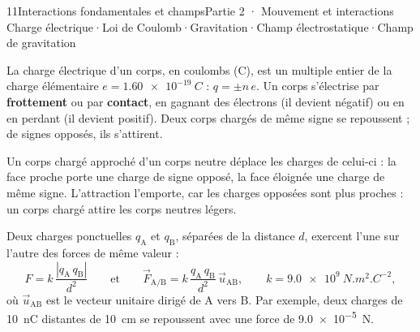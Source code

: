 \begin{ouverture}[gravitation]{11}{Interactions fondamentales et champs}{Partie 2 · Mouvement et interactions}
{Charge électrique\enspace·\enspace Loi de Coulomb\enspace·\enspace Gravitation\enspace·\enspace Champ électrostatique\enspace·\enspace Champ de gravitation}
\end{ouverture}
\essentiel
{}
\begin{definition}
La charge électrique d'un corps, en coulombs (C), est un multiple entier de la charge élémentaire $e=\qty{1,60e-19}{C}$ :
$q=\pm n\,e$. Un corps s'électrise par \textbf{frottement} ou par \textbf{contact}, en gagnant des électrons (il devient négatif) ou en
en perdant (il devient positif). Deux corps chargés de même signe se repoussent ; de signes opposés, ils s'attirent.
\end{definition}
\begin{propriete}
Un corps chargé approché d'un corps neutre déplace les charges de celui-ci : la face proche porte une charge de signe
opposé, la face éloignée une charge de même signe. L'attraction l'emporte, car les charges opposées sont plus proches :
un corps chargé attire les corps neutres légers.
\end{propriete}
\begin{loi}
Deux charges ponctuelles $q_\mathrm{A}$ et $q_\mathrm{B}$, séparées de la distance $d$, exercent l'une sur l'autre des forces de même valeur :
\[F=k\,\frac{|q_\mathrm{A}\,q_\mathrm{B}|}{d^2}\qquad\text{et}\qquad\vec{F}_{\mathrm{A}/\mathrm{B}}=k\,\frac{q_\mathrm{A}\,q_\mathrm{B}}{d^2}\,\vec{u}_{\mathrm{AB}},\qquad k=\qty{9,0e9}{N.m^2.C^{-2}},\]
où $\vec{u}_{\mathrm{AB}}$ est le vecteur unitaire dirigé de A vers B. Par exemple, deux charges de \qty{10}{nC} distantes de \qty{10}{cm} se
repoussent avec une force de \qty{9,0e-5}{N}.
\end{loi}
